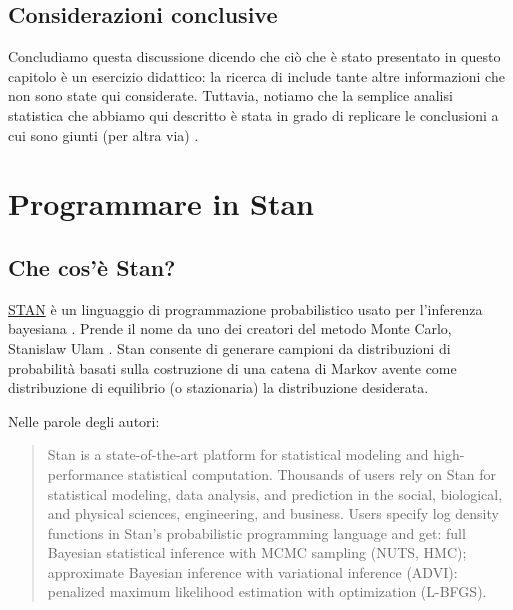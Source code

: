 \documentclass[
]{memoir}
\begin{document}
\hypertarget{considerazioni-conclusive}{%
\section*{Considerazioni conclusive}\label{considerazioni-conclusive}}

Concludiamo questa discussione dicendo che ciò che è stato presentato in questo capitolo è un esercizio didattico: la ricerca di \citet{Gautret_2020} include tante altre informazioni che non sono state qui considerate. Tuttavia, notiamo che la semplice analisi statistica che abbiamo qui descritto è stata in grado di replicare le conclusioni a cui sono giunti (per altra via) \citet{Hulme_2020}.

\hypertarget{intro-stan}{%
\chapter{Programmare in Stan}\label{intro-stan}}

\hypertarget{che-cosuxe8-stan}{%
\section{Che cos'è Stan?}\label{che-cosuxe8-stan}}

\href{http://mc-stan.org/}{STAN} è un linguaggio di programmazione probabilistico usato per l'inferenza bayesiana \citep{carpenter2017stan}. Prende il nome da uno dei creatori del metodo Monte Carlo, Stanislaw Ulam \citep{Eckhardt1987stan}. Stan consente di generare campioni da distribuzioni di probabilità basati sulla costruzione di una catena di Markov avente come distribuzione di equilibrio (o stazionaria) la distribuzione desiderata.

Nelle parole degli autori:

\begin{quote}
Stan is a state-of-the-art platform for statistical modeling and high-performance statistical computation. Thousands of users rely on Stan for statistical modeling, data analysis, and prediction in the social, biological, and physical sciences, engineering, and business. Users specify log density functions in Stan's probabilistic programming language and get: full Bayesian statistical inference with MCMC sampling (NUTS, HMC); approximate Bayesian inference with variational inference (ADVI): penalized maximum likelihood estimation with optimization (L-BFGS).
\end{quote}
\end{document}
